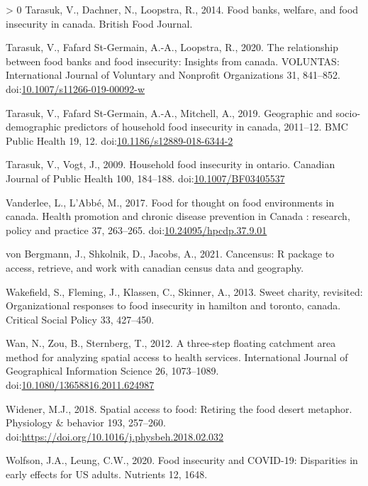 \documentclass[]{elsarticle} %
\newlength{\cslhangindent}
\newenvironment{CSLReferences}[3] %
 {%
  \setlength{\parindent}{0pt}
  \ifodd #1 \everypar{\setlength{\hangindent}{\cslhangindent}}\ignorespaces\fi
  \ifnum #2 > 0
  \setlength{\parskip}{#2\baselineskip}
  \fi
 }%
 {}
\begin{document}
\begin{CSLReferences}{1}{0}
\leavevmode\hypertarget{ref-tarasuk2014food}{}%
Tarasuk, V., Dachner, N., Loopstra, R., 2014. Food banks, welfare, and
food insecurity in canada. British Food Journal.

\leavevmode\hypertarget{ref-tarasuk2020relationship}{}%
Tarasuk, V., Fafard St-Germain, A.-A., Loopstra, R., 2020. The
relationship between food banks and food insecurity: Insights from
canada. VOLUNTAS: International Journal of Voluntary and Nonprofit
Organizations 31, 841--852.
doi:\href{https://doi.org/10.1007/s11266-019-00092-w}{10.1007/s11266-019-00092-w}

\leavevmode\hypertarget{ref-tarasuk2019geographic}{}%
Tarasuk, V., Fafard St-Germain, A.-A., Mitchell, A., 2019. Geographic
and socio-demographic predictors of household food insecurity in canada,
2011--12. BMC Public Health 19, 12.
doi:\href{https://doi.org/10.1186/s12889-018-6344-2}{10.1186/s12889-018-6344-2}

\leavevmode\hypertarget{ref-tarasuk2009household}{}%
Tarasuk, V., Vogt, J., 2009. Household food insecurity in ontario.
Canadian Journal of Public Health 100, 184--188.
doi:\href{https://doi.org/10.1007/BF03405537}{10.1007/BF03405537}

\leavevmode\hypertarget{ref-vanderlee2017food}{}%
Vanderlee, L., L'Abbé, M., 2017. Food for thought on food environments
in canada. Health promotion and chronic disease prevention in Canada :
research, policy and practice 37, 263--265.
doi:\href{https://doi.org/10.24095/hpcdp.37.9.01}{10.24095/hpcdp.37.9.01}

\leavevmode\hypertarget{ref-vonBergmann2021cancensus}{}%
von Bergmann, J., Shkolnik, D., Jacobs, A., 2021. Cancensus: R package
to access, retrieve, and work with canadian census data and geography.

\leavevmode\hypertarget{ref-wakefield2013sweet}{}%
Wakefield, S., Fleming, J., Klassen, C., Skinner, A., 2013. Sweet
charity, revisited: Organizational responses to food insecurity in
hamilton and toronto, canada. Critical Social Policy 33, 427--450.

\leavevmode\hypertarget{ref-wan2012three}{}%
Wan, N., Zou, B., Sternberg, T., 2012. A three-step floating catchment
area method for analyzing spatial access to health services.
International Journal of Geographical Information Science 26,
1073--1089.
doi:\href{https://doi.org/10.1080/13658816.2011.624987}{10.1080/13658816.2011.624987}

\leavevmode\hypertarget{ref-widener2018spatial}{}%
Widener, M.J., 2018. Spatial access to food: Retiring the food desert
metaphor. Physiology \& behavior 193, 257--260.
doi:\url{https://doi.org/10.1016/j.physbeh.2018.02.032}

\leavevmode\hypertarget{ref-wolfson2020food}{}%
Wolfson, J.A., Leung, C.W., 2020. Food insecurity and COVID-19:
Disparities in early effects for US adults. Nutrients 12, 1648.

\end{CSLReferences}
\end{document}
